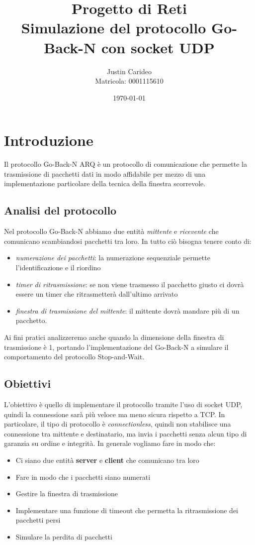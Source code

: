 \documentclass[a4paper,12pt]{report}
\title{Progetto di Reti\\ \textbf{Simulazione del protocollo Go-Back-N con socket UDP}}
\author{Justin Carideo\\ Matricola: 0001115610}
\date{\today}
\begin{document}
\maketitle

\newpage

\tableofcontents

\chapter{Introduzione}
Il protocollo Go-Back-N ARQ è un protocollo di comunicazione che permette 
la trasmissione di pacchetti dati in modo affidabile per mezzo di una 
implementazione particolare della tecnica della finestra scorrevole. 

\section{Analisi del protocollo}
Nel protocollo Go-Back-N abbiamo due entità \textit{mittente} e \textit{ricevente}
che comunicano scambiandosi pacchetti tra loro. In tutto ciò bisogna tenere
conto di:
\begin{itemize}
  \item \textit{numerazione dei pacchetti}: la numerazione sequenziale permette l'identificazione e il riordino
  \item \textit{timer di ritrasmissione}: se non viene trasmesso il pacchetto giusto ci dovrà essere un timer che ritrasmetterà dall'ultimo arrivato
  \item \textit{finestra di trasmissione del mittente}: il mittente dovrà mandare più di un pacchetto.
\end{itemize}
Ai fini pratici analizzeremo anche quando la dimensione della finestra di trasmissione è 1,
portando l'implementazione del Go-Back-N a simulare il comportamento del protocollo Stop-and-Wait.

\section{Obiettivi}
L'obiettivo è quello di implementare il protocollo tramite l'uso
di socket UDP, quindi la connessione sarà più veloce ma meno sicura rispetto
a TCP. In particolare, il tipo di protocollo è \textit{connectionless},
quindi non stabilisce una connessione tra mittente e destinatario, ma invia i pacchetti
senza alcun tipo di garanzia su ordine e integrità.
\newline
In generale vogliamo fare in modo che:
\begin{itemize}
  \item Ci siano due entità \textbf{server} e \textbf{client} che comunicano tra loro
  \item Fare in modo che i pacchetti siano numerati
  \item Gestire la finestra di trasmissione
  \item Implementare una funzione di timeout che permetta la ritrasmissione dei pacchetti persi
  \item Simulare la perdita di pacchetti
\end{itemize}
\end{document}
